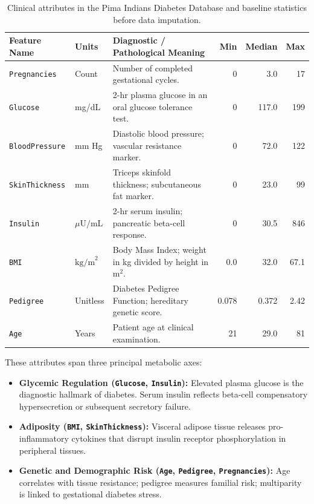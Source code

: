 \documentclass[12pt,a4paper,oneside]{report}
\begin{document}
\begin{table}[htbp]
\centering
\footnotesize
\renewcommand{\arraystretch}{0.80}
\begin{tabularx}{\textwidth}{l l X r r r}
\toprule
\textbf{Feature Name} & \textbf{Units} & \textbf{Diagnostic / Pathological Meaning} & \textbf{Min} & \textbf{Median} & \textbf{Max} \\
\midrule
\texttt{Pregnancies} & Count & Number of completed gestational cycles. & 0 & 3.0 & 17 \\
\texttt{Glucose} & mg/dL & 2-hr plasma glucose in an oral glucose tolerance test. & 0 & 117.0 & 199 \\
\texttt{BloodPressure} & mm Hg & Diastolic blood pressure; vascular resistance marker. & 0 & 72.0 & 122 \\
\texttt{SkinThickness} & mm & Triceps skinfold thickness; subcutaneous fat marker. & 0 & 23.0 & 99 \\
\texttt{Insulin} & $\mu\text{U/mL}$ & 2-hr serum insulin; pancreatic beta-cell response. & 0 & 30.5 & 846 \\
\texttt{BMI} & $\text{kg/m}^2$ & Body Mass Index; weight in kg divided by height in $\text{m}^2$. & 0.0 & 32.0 & 67.1 \\
\texttt{Pedigree} & Unitless & Diabetes Pedigree Function; hereditary genetic score. & 0.078 & 0.372 & 2.42 \\
\texttt{Age} & Years & Patient age at clinical examination. & 21 & 29.0 & 81 \\
\bottomrule
\end{tabularx}
\caption[Clinical Attributes and Baseline Statistics in PIDD]{Clinical attributes in the Pima Indians Diabetes Database and baseline statistics before data imputation.}
\label{tab:clinical_features}
\end{table}

These attributes span three principal metabolic axes:
\begin{itemize}
    \setlength{\itemsep}{0pt}
    \setlength{\parskip}{0pt}
    \item \textbf{Glycemic Regulation (\texttt{Glucose}, \texttt{Insulin}):} Elevated plasma glucose is the diagnostic hallmark of diabetes. Serum insulin reflects beta-cell compensatory hypersecretion or subsequent secretory failure.
    \item \textbf{Adiposity (\texttt{BMI}, \texttt{SkinThickness}):} Visceral adipose tissue releases pro-inflammatory cytokines that disrupt insulin receptor phosphorylation in peripheral tissues.
    \item \textbf{Genetic and Demographic Risk (\texttt{Age}, \texttt{Pedigree}, \texttt{Pregnancies}):} Age correlates with tissue resistance; pedigree measures familial risk; multiparity is linked to gestational diabetes stress.
\end{itemize}
\end{document}
